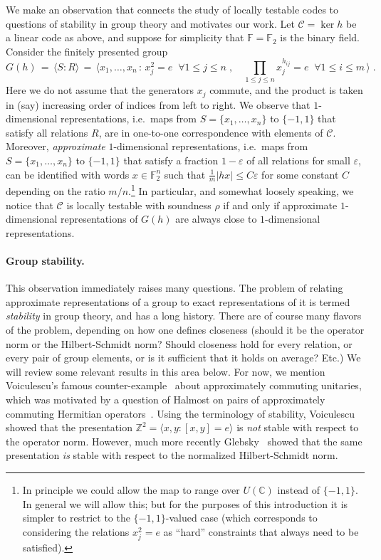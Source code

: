 \documentclass[11pt]{article}
\theoremstyle{definition}
\newcommand{\code}{\mathscr{C}}
\newcommand{\C}{\ensuremath{\mathbb{C}}}
\newcommand{\F}{\ensuremath{\mathbb{F}}}
\newcommand{\Z}{\ensuremath{\mathbb{Z}}}
\newcommand{\eps}{\varepsilon}
\begin{document}
We make an observation that connects the study of locally testable codes to questions of stability in group theory and motivates our work. Let $\code=\ker h$ be a linear code as above, and suppose for simplicity that $\F=\F_2$ is the binary field. Consider the finitely presented group 
\begin{equation}\label{eq:gh-intro}
 G(h) \,=\, \langle S:R\rangle \,=\, \big\langle x_1,\ldots,x_n \,:\, x_j^2=e\;\; \forall 1\leq j\leq n\;,\quad \prod_{1\leq j \leq n} x_j^{h_{ij}} = e \;\; \forall 1\leq i\leq m\,\big\rangle\;.
\end{equation}
Here we do not assume that the generators $x_j$ commute, and the product is taken in (say) increasing order of indices from left to right. We observe that $1$-dimensional representations, i.e.\ maps from $S=\{x_1,\ldots,x_n\}$ to $\{-1,1\}$ that satisfy all relations $R$, are in one-to-one correspondence with elements of $\code$. Moreover, \emph{approximate} $1$-dimensional representations, i.e.\ maps from  $S=\{x_1,\ldots,x_n\}$ to $\{-1,1\}$ that satisfy a fraction $1-\eps$ of all relations for small $\eps$, can be identified with words $x\in\F_2^n$ such that $\frac{1}{m}|hx|\leq C\eps$ for some constant $C$ depending on the ratio $m/n$.\footnote{In principle we could allow the map to range over $U(\C)$ instead of $\{-1,1\}$. In general we will allow this; but for the purposes of this introduction it is simpler to restrict to the $\{-1,1\}$-valued case (which corresponds to considering the relations $x_j^2=e$ as ``hard'' constraints that always need to be satisfied).} In particular, and somewhat loosely speaking, we notice that $\code$ is locally testable with soundness $\rho$ if and only if approximate $1$-dimensional representations of $G(h)$ are always close to $1$-dimensional representations. 

\paragraph{Group stability.}
This observation immediately raises many questions. The problem of relating approximate representations of a group to exact representations of it is termed \emph{stability} in group theory, and has a long history. There are of course many flavors of the problem, depending on how one defines closeness (should it be the operator norm or the Hilbert-Schmidt norm? Should closeness hold for every relation, or every pair of group elements, or is it sufficient that it holds on average? Etc.) We will review some relevant results in this area below. For now, we mention Voiculescu's famous counter-example~\cite{voiculescu1983asymptotically} about approximately commuting unitaries, which was motivated by a question of Halmost on pairs of approximately commuting Hermitian operators~\cite{halmos1976some}. Using the terminology of stability, Voiculescu showed that the presentation $\Z^2 = \langle x,y:[x,y]=e\rangle$ is \emph{not} stable with respect to the operator norm. However, much more recently Glebsky~\cite{glebsky2010almost} showed that the same presentation \emph{is} stable with respect to the normalized Hilbert-Schmidt norm. 
\end{document}
